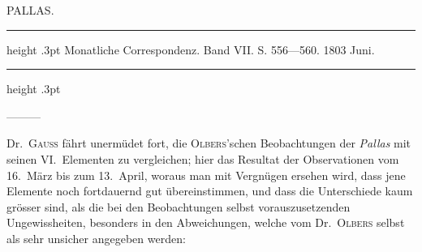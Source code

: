\begin{flushright}
\end{flushright}

\par\medskip
{}
\begin{center}\large PALLAS.\end{center}
\begin{center}\parbox{.86\linewidth}{\centering\footnotesize\frenchspacing
\hrule height .3pt\relax\vspace{2.5pt}
Monatliche Correspondenz. Band VII. S. 556—560. 1803 Juni.\par
\vspace{2.5pt}\hrule height .3pt\relax
}\end{center}
\par\indent ---\enspace---\enspace---\par\nobreak

Dr.\ \textsc{Gauss} fährt unermüdet fort, die \textsc{Olbers}'schen Beobachtungen der \emph{Pallas} mit seinen VI.\ Elementen zu vergleichen; hier das Resultat der Observationen vom 16.\ März bis zum 13.\ April, woraus man mit Vergnügen ersehen wird, dass jene Elemente noch fortdauernd gut übereinstimmen, und dass die Unterschiede kaum grösser sind, als die bei den Beobachtungen selbst vorauszusetzenden Ungewissheiten, besonders in den Abweichungen, welche vom Dr.\ \textsc{Olbers} selbst als sehr unsicher angegeben werden:

